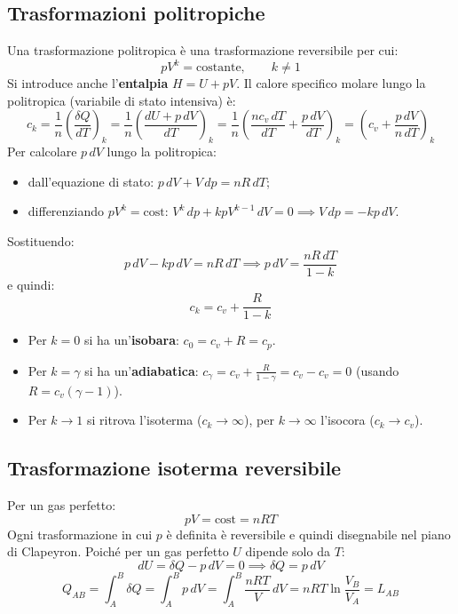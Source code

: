 \documentclass[11pt, a4paper, openright]{book}
\theoremstyle{plain}
\theoremstyle{definition}
\theoremstyle{remark}
\begin{document}
\subsection{Trasformazioni politropiche}
Una trasformazione politropica è una trasformazione reversibile per cui:
\begin{equation}
    pV^k = \text{costante}, \qquad k \neq 1
\end{equation}
Si introduce anche l'\textbf{entalpia} $H = U + pV$. Il calore specifico molare lungo la politropica (variabile di stato intensiva) è:
\begin{equation}
    c_k = \frac{1}{n}\left(\frac{\delta Q}{dT}\right)_k = \frac{1}{n}\left(\frac{dU + p\,dV}{dT}\right)_k = \frac{1}{n}\left(\frac{nc_v\,dT}{dT} + \frac{p\,dV}{dT}\right)_k = \left(c_v + \frac{p\,dV}{n\,dT}\right)_k
\end{equation}
Per calcolare $p\,dV$ lungo la politropica:
\begin{itemize}
    \item dall'equazione di stato: $p\,dV + V\,dp = nR\,dT$;
    \item differenziando $pV^k = \text{cost}$: $V^k\,dp + kpV^{k-1}\,dV = 0 \implies V\,dp = -kp\,dV$.
\end{itemize}
Sostituendo:
\begin{equation}
    p\,dV - kp\,dV = nR\,dT \implies p\,dV = \frac{nR\,dT}{1 - k}
\end{equation}
e quindi:
\begin{equation}
    \boxed{c_k = c_v + \frac{R}{1 - k}}
\end{equation}
\begin{itemize}
    \item Per $k = 0$ si ha un'\textbf{isobara}: $c_0 = c_v + R = c_p$.
    \item Per $k = \gamma$ si ha un'\textbf{adiabatica}: $c_\gamma = c_v + \frac{R}{1 - \gamma} = c_v - c_v = 0$ (usando $R = c_v(\gamma - 1)$).
    \item Per $k \to 1$ si ritrova l'isoterma ($c_k \to \infty$), per $k \to \infty$ l'isocora ($c_k \to c_v$).
\end{itemize}

\subsection{Trasformazione isoterma reversibile}
Per un gas perfetto:
\begin{equation}
    pV = \text{cost} = nRT
\end{equation}
Ogni trasformazione in cui $p$ è definita è reversibile e quindi disegnabile nel piano di Clapeyron. Poiché per un gas perfetto $U$ dipende solo da $T$:
\begin{equation}
    dU = \delta Q - p\,dV = 0 \implies \delta Q = p\,dV
\end{equation}
\begin{equation}
    Q_{AB} = \int_A^B \delta Q = \int_A^B p\,dV = \int_A^B \frac{nRT}{V}\,dV = \boxed{nRT\ln\frac{V_B}{V_A}} = L_{AB}
\end{equation}
\end{document}

